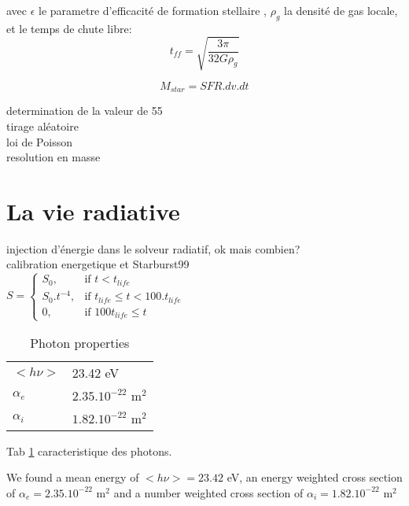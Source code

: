 avec  $\epsilon$ le parametre d'efficacité de formation stellaire , $\rho_g$ la densité de gas locale, et le temps de chute libre:
\begin{equation}
t_{ff} = \sqrt{\frac{3\pi}{32G\rho_g}}
\end{equation}

\begin{equation}
	M_{star} = SFR . dv .dt 
\end{equation}

determination de la valeur de 55\\

tirage aléatoire\\
loi de Poisson\\

resolution en masse\\



\section{La vie radiative}

injection d'énergie dans le solveur radiatif, ok mais combien?\\
calibration energetique et Starburst99\\


$
    S = 
\begin{cases}
    S_0 ,         & \text{if } t < t_{life}\\
    S_0.t^{-4},   & \text{if } t_{life} \leq t < 100.t_{life} \\
    0,   & \text{if } 100t_{life} \leq t
\end{cases}
$


\begin{table}
\begin{tabular}{|l|l|}
  \hline
	$<h\nu>$	&  23.42 eV \\
	$\alpha_e$	&  $2.35.10^{-22}$ m$^2$ \\
	$\alpha_i$	&  $1.82.10^{-22}$ m$^2$ \\
  \hline
\end{tabular}
\caption{Photon properties
\label{tab_photon}}
\end{table}

Tab \ref{tab_photon} caracteristique des photons.




We found a mean energy of $<h\nu> = 23.42$ eV,
an energy weighted cross section of
$\alpha_e = 2.35.10^{-22}$ m$^2$
and a number weighted cross section of
$\alpha_i = 1.82.10^{-22}$ m$^2$



